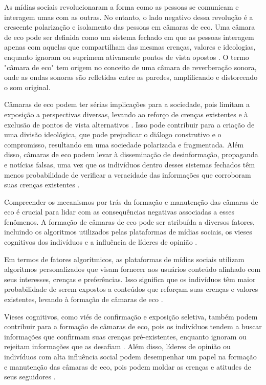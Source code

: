As mídias sociais revolucionaram a forma como as pessoas se comunicam e interagem umas com as outras. No entanto, o lado negativo dessa revolução é a crescente polarização e isolamento das pessoas em câmaras de eco. Uma câmara de eco pode ser definida como um sistema fechado em que as pessoas interagem apenas com aquelas que compartilham das mesmas crenças, valores e ideologias, enquanto ignoram ou suprimem ativamente pontos de vista opostos \cite[]{2015_Bakshy}. O termo "câmara de eco" tem origem no conceito de uma câmara de reverberação sonora, onde as ondas sonoras são refletidas entre as paredes, amplificando e distorcendo o som original.

Câmaras de eco podem ter sérias implicações para a sociedade, pois limitam a exposição a perspectivas diversas, levando ao reforço de crenças existentes e à exclusão de pontos de vista alternativos \cite[]{2001_Sunstein_BOOK}. Isso pode contribuir para a criação de uma divisão ideológica, que pode prejudicar o diálogo construtivo e o compromisso, resultando em uma sociedade polarizada e fragmentada. Além disso, câmaras de eco podem levar à disseminação de desinformação, propaganda e notícias falsas, uma vez que os indivíduos dentro desses sistemas fechados têm menos probabilidade de verificar a veracidade das informações que corroboram suas crenças existentes \cite[]{2016_Vicario}.

Compreender os mecanismos por trás da formação e manutenção das câmaras de eco é crucial para lidar com as consequências negativas associadas a esses fenômenos. A formação de câmaras de eco pode ser atribuída a diversos fatores, incluindo os algoritmos utilizados pelas plataformas de mídias sociais, os vieses cognitivos dos indivíduos e a influência de líderes de opinião \cite[]{2016_Flaxman}.

Em termos de fatores algorítmicos, as plataformas de mídias sociais utilizam algoritmos personalizados que visam fornecer aos usuários conteúdo alinhado com seus interesses, crenças e preferências. Isso significa que os indivíduos têm maior probabilidade de serem expostos a conteúdos que reforçam suas crenças e valores existentes, levando à formação de câmaras de eco \cite[]{2015_Bakshy}.

Vieses cognitivos, como viés de confirmação e exposição seletiva, também podem contribuir para a formação de câmaras de eco, pois os indivíduos tendem a buscar informações que confirmam suas crenças pré-existentes, enquanto ignoram ou rejeitam informações que as desafiam \cite[]{2006_Taber}. Além disso, líderes de opinião ou indivíduos com alta influência social podem desempenhar um papel na formação e manutenção das câmaras de eco, pois podem moldar as crenças e atitudes de seus seguidores \cite[]{2015_Bakshy}.

